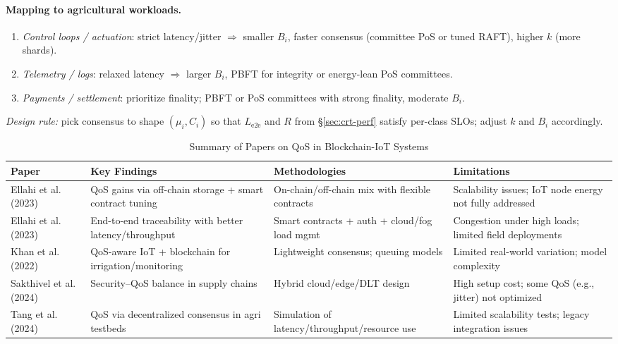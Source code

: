 \documentclass[12pt,onecolumn]{IEEEtran} %
\newcommand{\fitToPage}[1]{\begin{adjustbox}{max width=\textwidth}#1\end{adjustbox}}
\renewcommand{\arraystretch}{1.2}
\begin{document}
\paragraph{Mapping to agricultural workloads.}
\begin{enumerate}
    \item \textit{Control loops / actuation}: strict latency/jitter $\Rightarrow$ smaller $B_i$, faster consensus (committee PoS or tuned RAFT), higher $k$ (more shards).
    \item \textit{Telemetry / logs}: relaxed latency $\Rightarrow$ larger $B_i$, PBFT for integrity or energy-lean PoS committees.
    \item \textit{Payments / settlement}: prioritize finality; PBFT or PoS committees with strong finality, moderate $B_i$.
\end{enumerate}

\noindent\textit{Design rule:} pick consensus to shape $(\mu_i,C_i)$ so that $L_{\mathrm{e2e}}$ and $R$ from §\ref{sec:crt-perf} satisfy per-class SLOs; adjust $k$ and $B_i$ accordingly.


\begin{table}[htbp]
\caption{Summary of Papers on QoS in Blockchain-IoT Systems}
\label{table4}
\centering
\fitToPage{
\begingroup
\setlength{\tabcolsep}{4pt}
\renewcommand{\arraystretch}{1.15}
\footnotesize
\begin{tabularx}{\textwidth}{@{}P{0.18\textwidth}YYY@{}}
\toprule
\textbf{Paper} & \textbf{Key Findings} & \textbf{Methodologies} & \textbf{Limitations} \\
\midrule
Ellahi et al. (2023) & QoS gains via off-chain storage + smart contract tuning & On-chain/off-chain mix with flexible contracts & Scalability issues; IoT node energy not fully addressed \\
\addlinespace
Ellahi et al. (2023) & End-to-end traceability with better latency/throughput & Smart contracts + auth + cloud/fog load mgmt & Congestion under high loads; limited field deployments \\
\addlinespace
Khan et al. (2022) & QoS-aware IoT + blockchain for irrigation/monitoring & Lightweight consensus; queuing models & Limited real-world variation; model complexity \\
\addlinespace
Sakthivel et al. (2024) & Security–QoS balance in supply chains & Hybrid cloud/edge/DLT design & High setup cost; some QoS (e.g., jitter) not optimized \\
\addlinespace
Tang et al. (2024) & QoS via decentralized consensus in agri testbeds & Simulation of latency/throughput/resource use & Limited scalability tests; legacy integration issues \\
\bottomrule
\end{tabularx}
\endgroup
}
\end{table}
\end{document}
